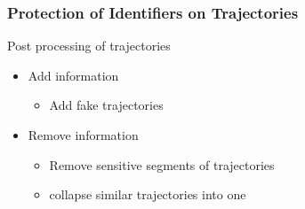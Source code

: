 \begin{frame}[red] %
\frametitle{Protection of Identifiers on Trajectories}
Post processing of trajectories
	\begin{itemize}	 
	\item  Add information
		\begin{itemize}
			\item Add fake trajectories
		\end{itemize}
	\item Remove information 
		\begin{itemize}
			\item Remove sensitive segments of trajectories 
			\item collapse similar trajectories into one
		\end{itemize}
	\end{itemize}
\end{frame}


% 
